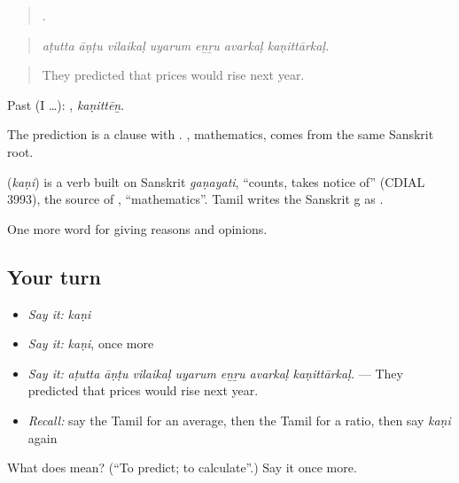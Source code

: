 \begin{quote}
      .
\end{quote}

\begin{quote}
\emph{aṭutta āṇṭu vilaikaḷ uyarum eṉṟu avarkaḷ kaṇittārkaḷ.}
\end{quote}

\begin{quote}
They predicted that prices would rise next year.
\end{quote}

Past (I …): , \emph{kaṇittēṉ}.

The prediction is a clause with . , mathematics, comes from the same Sanskrit root.

\begin{cousinweb}
\textbf{} (\emph{kaṇi}) is a verb built on Sanskrit \emph{gaṇayati}, \textquotedblleft{}counts, takes notice of\textquotedblright{} (CDIAL 3993), the source of , \textquotedblleft{}mathematics\textquotedblright{}. Tamil writes the Sanskrit g as .
\end{cousinweb}

\begin{grammarlens}[title={What you've built}]
One more word for giving reasons and opinions.
\end{grammarlens}

\subsection*{Your turn}
\begin{itemize}
\raggedright
  \item \emph{Say it:} \emph{kaṇi}
  \item \emph{Say it:} \emph{kaṇi}, once more
  \item \emph{Say it:} \emph{aṭutta āṇṭu vilaikaḷ uyarum eṉṟu avarkaḷ kaṇittārkaḷ.} — They predicted that prices would rise next year.
  \item \emph{Recall:} say the Tamil for an average, then the Tamil for a ratio, then say \emph{kaṇi} again
\end{itemize}

\begin{tcolorbox}[breakable,colback=teal!4,colframe=teal!35!black,title={Before you move on}]
What does  mean? (\textquotedblleft{}To predict; to calculate\textquotedblright{}.) Say it once more.
\end{tcolorbox}
